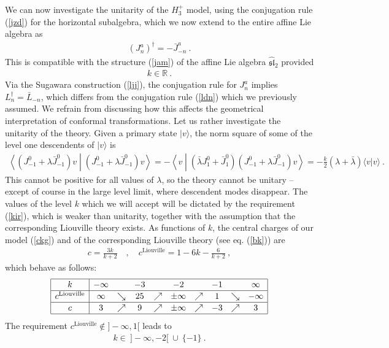\documentclass[12pt,a4paper,notitlepage]{report}
\numberwithin{equation}{section}
\theoremstyle{break}
\begin{document}
We can now investigate the unitarity of the $H_3^+$ model, using the conjugation rule (\ref{jzd}) for the horizontal subalgebra, which we now extend to the entire affine Lie algebra as 
\begin{align}
 \boxed{(J^a_n)^\dagger = -\bar{J}^a_{-n}}\ .
\label{jdj}
\end{align}
This is compatible with the structure (\ref{jam}) of the affine Lie algebra $\hat{\mathfrak{sl}}_2$ provided 
\begin{align}
 k\in\mathbb{R}\ .
\label{kir}
\end{align}
Via the Sugawara construction (\ref{ljj}), the conjugation rule for $J^a_n$ implies $L_n^\dagger = \bar{L}_{-n}$, which differs from the conjugation rule (\ref{ldn}) which we previously assumed. 
We refrain from discussing how this affects the geometrical interpretation of conformal transformations.
Let us rather investigate the unitarity of the theory. 
Given a primary state $|v\rangle$, the norm square of some of the level one descendents of $|v\rangle$ is
\begin{align}
 \left\langle (J^0_{-1}+\lambda\bar{J}^0_{-1})v \middle| (J^0_{-1}+\lambda\bar{J}^0_{-1})v \right\rangle
= -\left\langle v \middle| (\bar{\lambda} J^0_1+\bar{J}^0_1)(J^0_{-1}+\lambda\bar{J}^0_{-1})v \right\rangle 
= -\frac{k}{2}(\lambda+\bar{\lambda}) \langle v| v\rangle\ .
\label{viv}
\end{align}
This cannot be positive for all values of $\lambda$,  
so the theory cannot be unitary -- except of course in the large level limit, where descendent modes disappear. 
The values of the level $k$ which we will accept will be dictated by the requirement (\ref{kir}), which is weaker than unitarity, together with the assumption that the corresponding Liouville theory exists.
As functions of $k$, the central charges of our model (\ref{ckg}) and of the corresponding Liouville theory (see eq. (\ref{bk})) are
\begin{align}
 c = \frac{3k}{k+2} \quad , \quad c^{\text{Liouville}} = 1-6k-\frac{6}{k+2}\ ,
\end{align} 
which behave as follows:
\begin{align}
\renewcommand{\arraystretch}{1.1}
 \begin{array}{|c|ccccccccc|}
  \hline 
k & -\infty & & -3 & & -2 & & -1 & & \infty 
\\ \hline  
c^{\text{Liouville}} & \infty & \searrow & 25 & \nearrow & \pm \infty & \nearrow & 1 & \searrow & -\infty
\\ \hline
c & 3 & \nearrow & 9 & \nearrow & \pm \infty & \nearrow & -3 & \nearrow & 3
\\ \hline 
 \end{array}
\end{align}
The requirement $c^{\text{Liouville}}\notin ]-\infty,1[$ leads to 
\begin{align}
 \boxed{k\in\ ]-\infty,-2[\ \cup\ \{-1\}}\ .
\label{kito}
\end{align}
\end{document}
